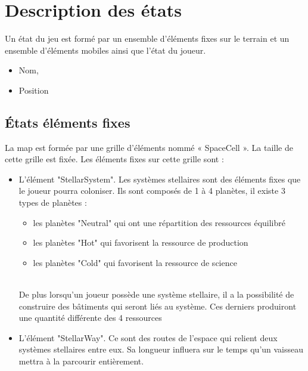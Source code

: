 \section{Description des états}

Un état du jeu est formé par un ensemble d’éléments fixes sur le terrain et un ensemble
d’éléments mobiles ainsi que l'état du joueur. 


\begin{itemize}
\item Nom,
\item Position
\end{itemize}

\subsection{États éléments fixes}

La map est formée par une grille d’éléments nommé « SpaceCell ». La taille de cette grille est
fixée. Les éléments fixes sur cette grille sont :\\

\begin{itemize}
\item L'élément "StellarSystem". Les systèmes stellaires sont des éléments
fixes que le joueur pourra coloniser. Ils sont composés de 1 à 4 planètes, il existe 3 types de planètes :\\

\begin{itemize}
\item les planètes "Neutral" qui ont une répartition des ressources équilibré
\item les planètes "Hot" qui favorisent la ressource de production
\item les planètes "Cold" qui favorisent la ressource de science
\end{itemize}\\

De plus lorsqu'un joueur possède une système stellaire, il a la possibilité de construire des bâtiments qui seront liés au système. Ces derniers produiront une quantité différente des 4 ressources\\





\item L'élément "StellarWay". Ce sont des routes de l'espace qui relient deux systèmes stellaires entre eux. Sa longueur influera sur le temps qu'un vaisseau mettra à la parcourir entièrement.
\end{itemize}

